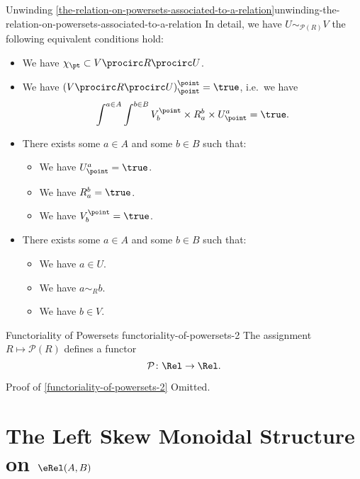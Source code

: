 \begin{remark}{Unwinding \cref{the-relation-on-powersets-associated-to-a-relation}}{unwinding-the-relation-on-powersets-associated-to-a-relation}%
    In detail, we have $U\sim_{\mathcal{P}(R)}V$ \textiff the following equivalent conditions hold:
    \begin{itemize}
        \item We have $\chi_{\pt}\subset V\procirc R\procirc U$.
        \item We have $(V\procirc R\procirc U)^{\point}_{\point}=\true$, i.e.\ we have
            \[
                \int^{a\in A}\int^{b\in B}V^{\point}_{b}\times R^{b}_{a}\times U^{a}_{\point}%
                =%
                \true.%
            \]%
        \item There exists some $a\in A$ and some $b\in B$ such that:
            \begin{itemize}
                \item We have $U^{a}_{\point}=\true$.
                \item We have $R^{b}_{a}=\true$.
                \item We have $V^{\point}_{b}=\true$.
            \end{itemize}
        \item There exists some $a\in A$ and some $b\in B$ such that:
            \begin{itemize}
                \item We have $a\in U$.
                \item We have $a\sim_{R}b$.
                \item We have $b\in V$.
            \end{itemize}
    \end{itemize}
\end{remark}
\begin{proposition}{Functoriality of Powersets \rmII}{functoriality-of-powersets-2}%
    The assignment $R\mapsto\mathcal{P}(R)$ defines a functor
    \[
        \mathcal{P}%
        \colon%
        \Rel%
        \to%
        \Rel.
    \]%
\end{proposition}
\begin{Proof}{Proof of \cref{functoriality-of-powersets-2}}%
    Omitted.
\end{Proof}
\section{The Left Skew Monoidal Structure on $\eRel(A,B)$}\label{section-the-left-skew-monoidal-structure-on-rel-a-b}
